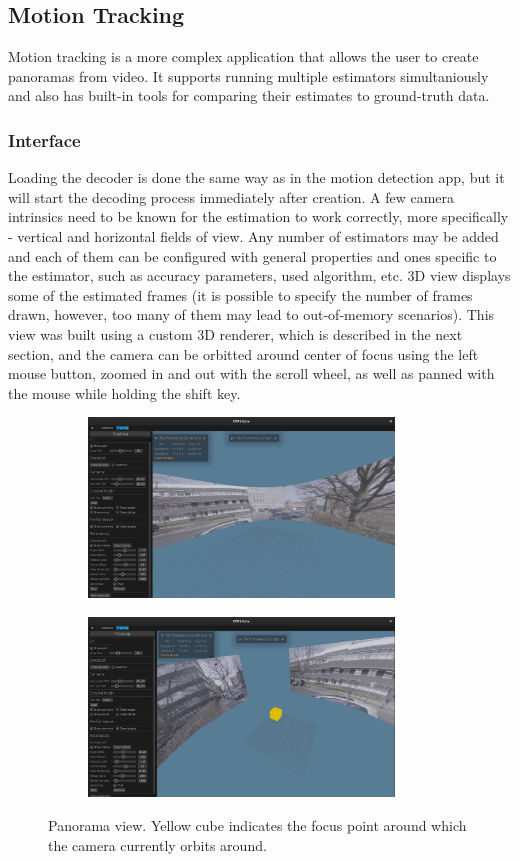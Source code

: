 \documentclass[11pt,english]{report}
\begin{document}
\subsection{Motion Tracking}

Motion tracking is a more complex application that allows the user to create panoramas from video. It supports running multiple estimators simultaniously and also has built-in tools for comparing their estimates to ground-truth data.

\subsubsection{Interface}

Loading the decoder is done the same way as in the motion detection app, but it will start the decoding process immediately after creation. A few camera intrinsics need to be known for the estimation to work correctly, more specifically - vertical and horizontal fields of view. Any number of estimators may be added and each of them can be configured with general properties and ones specific to the estimator, such as accuracy parameters, used algorithm, etc. 3D view displays some of the estimated frames (it is possible to specify the number of frames drawn, however, too many of them may lead to out-of-memory scenarios). This view was built using a custom 3D renderer, which is described in the next section, and the camera can be orbitted around center of focus using the left mouse button, zoomed in and out with the scroll wheel, as well as panned with the mouse while holding the shift key.

\begin{figure}[!ht]
	\centering
	\centering
	\begin{subfigure}{230pt}
		\includegraphics[width=230pt]{docs/report/panorama2.jpg}
	\end{subfigure}
	\begin{subfigure}{230pt}
		\includegraphics[width=230pt]{docs/report/panorama.jpg}
	\end{subfigure}
	\caption{\centering Panorama view. Yellow cube indicates the focus point around which the camera currently orbits around.}
\end{figure}
\end{document}
